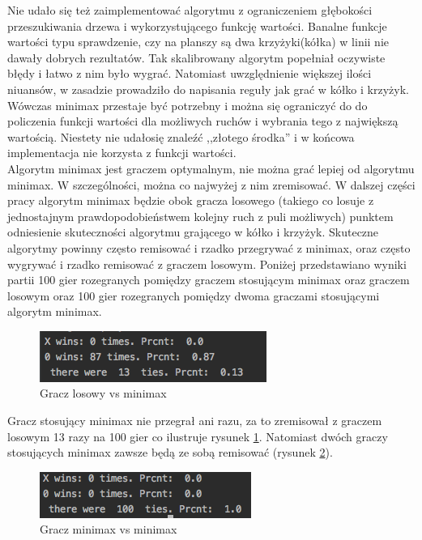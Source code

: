 \documentclass[licencjacka]{pracamgr}
\begin{document}
Nie udało się też zaimplementować algorytmu z ograniczeniem głębokości przeszukiwania drzewa i wykorzystującego funkcję wartości. Banalne funkcje wartości typu sprawdzenie,  czy na planszy są dwa krzyżyki(kółka) w linii nie dawały dobrych rezultatów. Tak skalibrowany algorytm popełniał oczywiste błędy i łatwo z nim było wygrać.  Natomiast uwzględnienie większej ilości niuansów, w zasadzie prowadziło do napisania reguły jak grać w kółko i krzyżyk. Wówczas minimax przestaje być potrzebny i można się ograniczyć do do policzenia funkcji wartości dla możliwych ruchów i wybrania tego z największą wartością. Niestety nie udałosię znaleźć ,,złotego środka'' i w końcowa implementacja nie korzysta z funkcji wartości. \\

Algorytm minimax jest graczem optymalnym, nie można grać lepiej od algorytmu minimax. W szczególności, można co najwyżej z nim zremisować. W dalszej części pracy algorytm minimax będzie obok gracza losowego (takiego co losuje z jednostajnym prawdopodobieństwem kolejny ruch z puli możliwych) punktem odniesienie skuteczności algorytmu grającego w kółko i krzyżyk. Skuteczne algorytmy powinny często remisować i rzadko przegrywać z minimax, oraz często wygrywać i rzadko remisować z graczem losowym. Poniżej przedstawiano wyniki partii 100 gier rozegranych pomiędzy graczem stosującym minimax oraz graczem losowym  oraz 100 gier rozegranych pomiędzy dwoma graczami stosującymi algorytm minimax.\\ 

\begin{figure}[h!]
	\includegraphics [scale=0.6] {random_minimax.png}
	\caption{Gracz losowy vs minimax}
	\label{Rys5}
\end{figure}

Gracz stosujący minimax nie przegrał ani razu, za to zremisował z graczem losowym 13 razy na 100 gier co ilustruje rysunek \ref{Rys5}. 
Natomiast dwóch graczy stosujących minimax zawsze będą ze sobą remisować (rysunek \ref{Rys6}). 

\begin{figure}[h!]
	\includegraphics [scale=0.6] {minimax_minimax.png}
	\caption{Gracz minimax vs minimax}
	\label{Rys6}
\end{figure}
\end{document}
